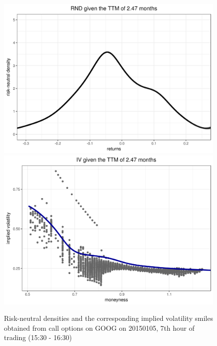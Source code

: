 \documentclass[a4paper,12pt]{article}
\theoremstyle{plain}
\theoremstyle{definition}
\begin{document}
\begin{figure}[H]
\begin{center}
 \endminipage\\
 \includegraphics[width=\linewidth]{figures/hour_7th/GOOG_20150105_rnd_ci_7th_hour_ttm_2_47.png}
 \endminipage
 \hspace{3mm}
 \includegraphics[width=\linewidth]{figures/hour_7th/GOOG_20150105_iv_smile_7th_hour_ttm_2_47.png}
 \endminipage
\end{center}
\vspace{-3mm}
\caption{\footnotesize Risk-neutral densities and the corresponding implied volatility smiles obtained from call options on GOOG on 20150105, 7th hour of trading (15:30 - 16:30)} 
\label{rnd4}
\end{figure}





\end{document}

